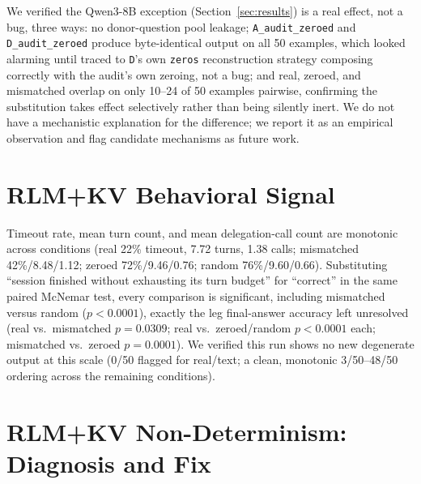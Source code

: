 \documentclass[11pt]{article}
\begin{document}
We verified the Qwen3-8B exception (Section~\ref{sec:results}) is a
real effect, not a bug, three ways: no donor-question pool leakage;
\texttt{A\_audit\_zeroed} and \texttt{D\_audit\_zeroed} produce
byte-identical output on all 50 examples, which looked alarming until
traced to \texttt{D}'s own \texttt{zeros} reconstruction strategy
composing correctly with the audit's own zeroing, not a bug; and real,
zeroed, and mismatched overlap on only 10--24 of 50 examples pairwise,
confirming the substitution takes effect selectively rather than being
silently inert. We do not have a mechanistic explanation for the
difference; we report it as an empirical observation and flag candidate
mechanisms as future work.

\section{RLM+KV Behavioral Signal}
\label{app:behavioral}

Timeout rate, mean turn count, and mean delegation-call count are
monotonic across conditions (real 22\% timeout, 7.72 turns, 1.38 calls;
mismatched 42\%/8.48/1.12; zeroed 72\%/9.46/0.76; random 76\%/9.60/0.66).
Substituting ``session finished without exhausting its turn budget''
for ``correct'' in the same paired McNemar test, every comparison is
significant, including mismatched versus random ($p<0.0001$), exactly
the leg final-answer accuracy left unresolved (real vs.\ mismatched
$p=0.0309$; real vs.\ zeroed/random $p<0.0001$ each; mismatched vs.\
zeroed $p=0.0001$). We verified this run shows no new degenerate output
at this scale (0/50 flagged for real/text; a clean, monotonic
3/50--48/50 ordering across the remaining conditions).

\section{RLM+KV Non-Determinism: Diagnosis and Fix}
\label{app:nondeterminism}
\end{document}
